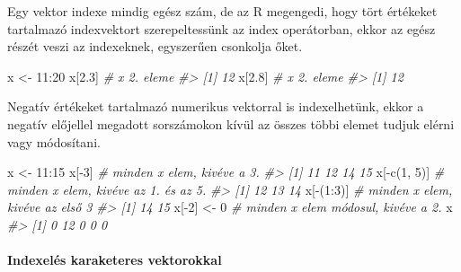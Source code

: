 \documentclass[
]{book}
\newenvironment{Shaded}{\begin{snugshade}}{\end{snugshade}}
\newcommand{\CommentTok}[1]{\textcolor[rgb]{0.56,0.35,0.01}{\textit{#1}}}
\newcommand{\DecValTok}[1]{\textcolor[rgb]{0.00,0.00,0.81}{#1}}
\newcommand{\FloatTok}[1]{\textcolor[rgb]{0.00,0.00,0.81}{#1}}
\newcommand{\FunctionTok}[1]{\textcolor[rgb]{0.00,0.00,0.00}{#1}}
\newcommand{\NormalTok}[1]{#1}
\newcommand{\OtherTok}[1]{\textcolor[rgb]{0.56,0.35,0.01}{#1}}
\newcommand{\SpecialCharTok}[1]{\textcolor[rgb]{0.00,0.00,0.00}{#1}}
\begin{document}
Egy vektor indexe mindig egész szám, de az R megengedi, hogy tört értékeket tartalmazó indexvektort szerepeltessünk az index operátorban, ekkor az egész részét veszi az indexeknek, egyszerűen csonkolja őket.

\begin{Shaded}
\begin{Highlighting}[]
\NormalTok{x }\OtherTok{\textless{}{-}} \DecValTok{11}\SpecialCharTok{:}\DecValTok{20}
\NormalTok{x[}\FloatTok{2.3}\NormalTok{]       }\CommentTok{\# x 2. eleme}
\CommentTok{\#\textgreater{} [1] 12}
\NormalTok{x[}\FloatTok{2.8}\NormalTok{]       }\CommentTok{\# x 2. eleme}
\CommentTok{\#\textgreater{} [1] 12}
\end{Highlighting}
\end{Shaded}

Negatív értékeket tartalmazó numerikus vektorral is indexelhetünk, ekkor a negatív előjellel megadott sorszámokon kívül az összes többi elemet tudjuk elérni vagy módosítani.

\begin{Shaded}
\begin{Highlighting}[]
\NormalTok{x }\OtherTok{\textless{}{-}} \DecValTok{11}\SpecialCharTok{:}\DecValTok{15}
\NormalTok{x[}\SpecialCharTok{{-}}\DecValTok{3}\NormalTok{]                         }\CommentTok{\# minden x elem, kivéve a 3.}
\CommentTok{\#\textgreater{} [1] 11 12 14 15}
\NormalTok{x[}\SpecialCharTok{{-}}\FunctionTok{c}\NormalTok{(}\DecValTok{1}\NormalTok{, }\DecValTok{5}\NormalTok{)]                   }\CommentTok{\# minden x elem, kivéve az 1. és az 5.}
\CommentTok{\#\textgreater{} [1] 12 13 14}
\NormalTok{x[}\SpecialCharTok{{-}}\NormalTok{(}\DecValTok{1}\SpecialCharTok{:}\DecValTok{3}\NormalTok{)]                     }\CommentTok{\# minden x elem, kivéve az első 3}
\CommentTok{\#\textgreater{} [1] 14 15}
\NormalTok{x[}\SpecialCharTok{{-}}\DecValTok{2}\NormalTok{] }\OtherTok{\textless{}{-}} \DecValTok{0}                    \CommentTok{\# minden x elem módosul, kivéve a 2.      }
\NormalTok{x}
\CommentTok{\#\textgreater{} [1]  0 12  0  0  0}
\end{Highlighting}
\end{Shaded}

\hypertarget{indexeluxe9s-karaketeres-vektorokkal}{%
\paragraph{Indexelés karaketeres vektorokkal}\label{indexeluxe9s-karaketeres-vektorokkal}}
\end{document}
